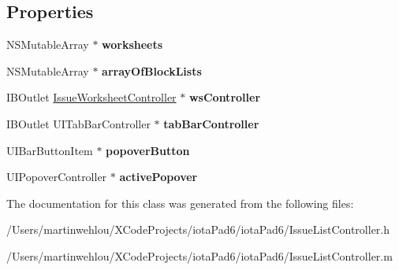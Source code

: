 \subsection*{Properties}
\begin{DoxyCompactItemize}
\item 
\hypertarget{interface_issue_list_controller_aedde5b5f845e520fa2addf74cf332f8b}{
NSMutableArray $\ast$ {\bfseries worksheets}}
\label{interface_issue_list_controller_aedde5b5f845e520fa2addf74cf332f8b}

\item 
\hypertarget{interface_issue_list_controller_aac6c618143a08f7109b07a7d3f0d844c}{
NSMutableArray $\ast$ {\bfseries arrayOfBlockLists}}
\label{interface_issue_list_controller_aac6c618143a08f7109b07a7d3f0d844c}

\item 
\hypertarget{interface_issue_list_controller_ab12f846bf2905229b042b5072846d014}{
IBOutlet \hyperlink{interface_issue_worksheet_controller}{IssueWorksheetController} $\ast$ {\bfseries wsController}}
\label{interface_issue_list_controller_ab12f846bf2905229b042b5072846d014}

\item 
\hypertarget{interface_issue_list_controller_a3b95a94e94494181aeb290061de761aa}{
IBOutlet UITabBarController $\ast$ {\bfseries tabBarController}}
\label{interface_issue_list_controller_a3b95a94e94494181aeb290061de761aa}

\item 
\hypertarget{interface_issue_list_controller_a469a73041335b4244a93fc438679765f}{
UIBarButtonItem $\ast$ {\bfseries popoverButton}}
\label{interface_issue_list_controller_a469a73041335b4244a93fc438679765f}

\item 
\hypertarget{interface_issue_list_controller_a7af559e7c02761a7de28a7ec22e08c5f}{
UIPopoverController $\ast$ {\bfseries activePopover}}
\label{interface_issue_list_controller_a7af559e7c02761a7de28a7ec22e08c5f}

\end{DoxyCompactItemize}


The documentation for this class was generated from the following files:\begin{DoxyCompactItemize}
\item 
/Users/martinwehlou/XCodeProjects/iotaPad6/iotaPad6/IssueListController.h\item 
/Users/martinwehlou/XCodeProjects/iotaPad6/iotaPad6/IssueListController.m\end{DoxyCompactItemize}

